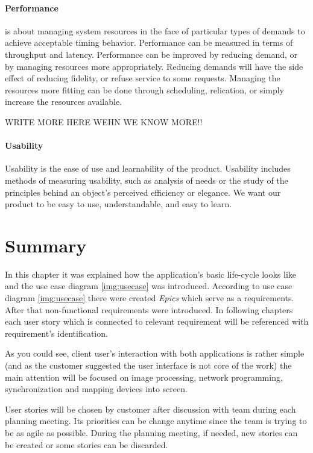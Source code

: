\paragraph{Performance}
is about managing system resources in the face of particular types of demands to achieve acceptable timing behavior. 
Performance can be measured in terms of throughput and latency. 
Performance can be improved by reducing demand, or by managing resources more appropriately. 
Reducing demands will have the side effect of reducing fidelity, or refuse service to some requests. 
Managing the resources more fitting can be done through scheduling, relication, or simply increase the resources available.

WRITE MORE HERE WEHN WE KNOW MORE!!


\paragraph{Usability}
Usability is the ease of use and learnability of the product.
Usability includes methods of measuring usability, such as analysis of needs or the study of the principles behind an object's perceived efficiency or elegance. We want our product to be easy to use, understandable, and easy to learn.  

\section{Summary}
In this chapter it was explained how the application's basic life-cycle looks like and the use case diagram \ref{img:usecase} was introduced.
According to use case diagram \ref{img:usecase} there were created \emph{Epics} which serve as a requirements. 
After that non-functional requirements were introduced.
In following chapters each user story which is connected to relevant requirement will be referenced with requirement's identification.

As you could see, client user's interaction with both applications is rather simple (and as the customer suggested the user interface is not core of the work) the main attention will be focused on image processing, network programming, synchronization and mapping devices into screen.

User stories will be chosen by customer after discussion with team during each planning meeting.
Its priorities can be change anytime since the team is trying to be as agile as possible.
During the planning meeting, if needed, new stories can be created or some stories can be discarded.

